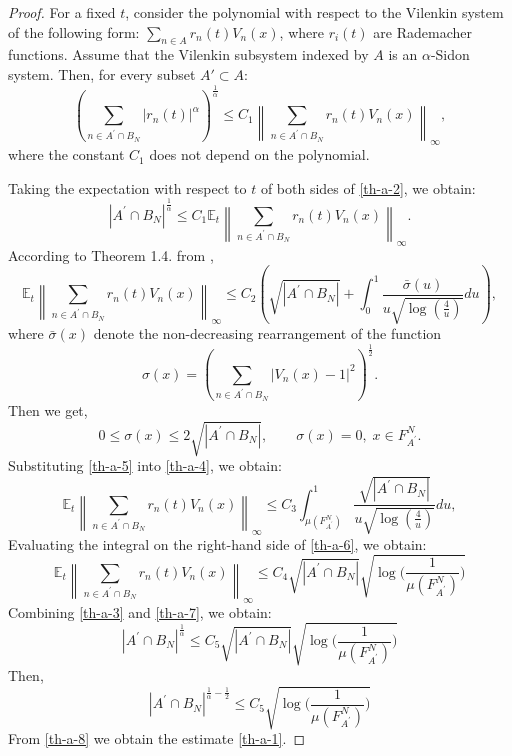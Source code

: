 \documentclass[12pt]{article}
\begin{document}
	\begin{proof}
		For a fixed $t$, consider the polynomial with respect to the Vilenkin system of the following form: $\sum_{n\in A} r_n(t)V_n(x)$, where $r_i(t)$ are Rademacher functions. Assume that the Vilenkin subsystem indexed by $A$ is an $\alpha$-Sidon system. Then, for every subset $A' \subset A$:
		\begin{equation} \label{th-a-2}
			\left(\sum_{n \in A^{\prime} \cap B_N} |r_n(t)|^{\alpha}\right)^{\frac{1}{\alpha}} \le C_1 \left\|\sum_{n \in A^{\prime} \cap B_N} r_n(t)V_n(x)\right\|_{\infty},
		\end{equation}
	where the constant $C_1$ does not depend on the polynomial.
		
		Taking the expectation with respect to $t$ of both sides of \eqref{th-a-2}, we obtain:
		\begin{equation} \label{th-a-3}
			|A^{\prime} \cap B_N |^{\frac{1}{\alpha}} \le C_1 \mathbb{E}_t \left\|\sum_{n \in A^{\prime} \cap B_N} r_n(t)V_n(x)\right\|_{\infty}.
		\end{equation}
		According to Theorem 1.4. from \cite{Marcus-Pisier}, 
		\begin{equation} \label{th-a-4}
			\mathbb{E}_t \left\|\sum_{n \in A^{\prime} \cap B_N} r_n(t)V_n(x)\right\|_{\infty} \le C_2 \left( \sqrt{|A^{\prime} \cap B_N |} + \int_0^1 \frac{\bar{\sigma}(u)}{u \sqrt{\log(\frac{4}{u})}} du \right),
		\end{equation}
		where $\bar{\sigma}(x)$ denote the non-decreasing rearrangement of the function  \[\sigma(x) =  \left(\sum_{n \in A^{\prime} \cap B_N} \bigl|V_n(x)-1\bigl|^2 \right)^{\frac{1}{2}}.\]
		Then we get, \begin{equation} \label{th-a-5} 0 \le \sigma(x) \le 2 \sqrt{|A^{\prime} \cap B_N |}, \qquad \sigma(x) = 0 , \; x \in F_{A^{\prime}}^N. 
		\end{equation}
		Substituting \eqref{th-a-5} into \eqref{th-a-4}, we obtain:
		\begin{equation} \label{th-a-6}
			\mathbb{E}_t \left\|\sum_{n \in A^{\prime} \cap B_N} r_n(t)V_n(x)\right\|_{\infty} \le C_3 \int_{\mu(F_{A^{\prime}}^N)}^1 \frac{\sqrt{|A^{\prime} \cap B_N |}}{u \sqrt{\log(\frac{4}{u})}} du,
		\end{equation}
		Evaluating the integral on the right-hand side of \eqref{th-a-6}, we obtain:
		\begin{equation} \label{th-a-7}
			\mathbb{E}_t \left\|\sum_{n \in A^{\prime} \cap B_N} r_n(t)V_n(x)\right\|_{\infty} \le C_4 \sqrt{|A^{\prime} \cap B_N|} \sqrt{\log \biggl(\frac{1}{\mu(F_{A^{\prime}}^{N})}\biggl)}
		\end{equation}	
	    Combining \eqref{th-a-3} and \eqref{th-a-7}, we obtain:
		\[
		|A^{\prime} \cap B_N |^{\frac{1}{\alpha}}\le C_5 \sqrt{|A^{\prime} \cap B_N|} \sqrt{\log \biggl(\frac{1}{\mu(F_{A^{\prime}}^{N})}\biggl)}
		\]
		Then, 
		\begin{equation} \label{th-a-8}
			|A^{\prime} \cap B_N |^{\frac{1}{\alpha} - \frac{1}{2}}\le C_5 \sqrt{\log \biggl(\frac{1}{\mu(F_{A^{\prime}}^{N})}\biggl)}
		\end{equation}	
		From \eqref{th-a-8} we obtain the estimate \eqref{th-a-1}.
	\end{proof}
	
\end{document}
